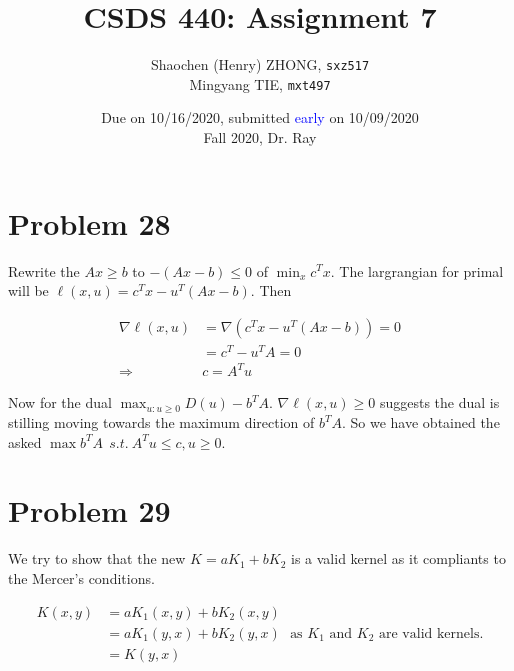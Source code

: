 \documentclass[12pt]{article}
\newcommand{\ilcode}{\texttt}
\begin{document}
\title{\textbf{CSDS 440: Assignment 7}}

\author{Shaochen (Henry) ZHONG, \ilcode{sxz517} \\ Mingyang TIE, \ilcode{mxt497}}
\date{Due on 10/16/2020, submitted \textcolor{blue}{early} on 10/09/2020 \\ Fall 2020, Dr. Ray}
\maketitle


\section{Problem 28}


Rewrite the $Ax \geq b$ to $-(Ax - b) \leq 0$ of $\min_x c^T x$. The largrangian for primal will be $\ell(x, u) = c^Tx - u^T (Ax - b)$. Then

\begin{align*}
    \nabla \ell(x, u) &= \nabla (c^Tx - u^T (Ax - b)) = 0\\
    &= c^T - u^TA  = 0 \\
    \Longrightarrow& c = A^T u
\end{align*}

Now for the dual $\max_{u: u \geq 0} D(u) - b^T A$. $\nabla \ell(x, u) \geq 0$ suggests the dual is stilling moving towards the maximum direction of $ b^T A$. So we have obtained the asked $\max b^T A \ \ s.t. \  A^T u \leq c, u \geq 0$.







\section{Problem 29}

We try to show that the new $K = aK_1 + bK_2$ is a valid kernel as it compliants to the Mercer's conditions.

\begin{align*}
    K(x, y) &= aK_1(x, y) + bK_2(x, y) \\
    &= aK_1(y, x) + bK_2(y, x) \ \ \ \text{as $K_1$ and $K_2$ are valid kernels.} \\
    &= K(y, x)
\end{align*}
\end{document}
